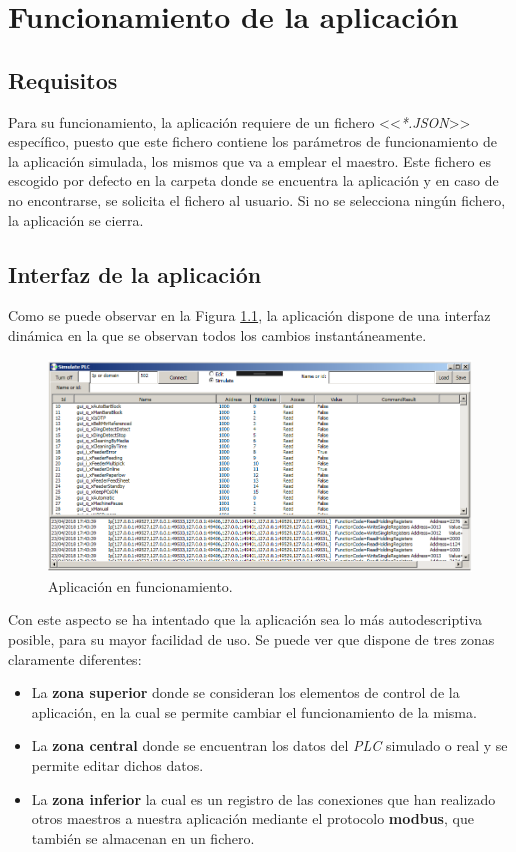 \documentclass[pdftex,11pt,a4paper]{book}
\begin{document}
\chapter{Funcionamiento de la aplicación}

\section{Requisitos}
Para su funcionamiento, la aplicación requiere de un fichero <<\emph{*.JSON}>> específico, puesto que este fichero contiene los parámetros de funcionamiento de la aplicación simulada, los mismos que va a emplear el maestro. Este fichero es escogido por defecto en la carpeta donde se encuentra la aplicación y en caso de no encontrarse, se solicita el fichero al usuario. Si no se selecciona ningún fichero, la aplicación se cierra. 

\section{Interfaz de la aplicación}
Como se puede observar en la Figura \ref{func_apli}, la aplicación dispone de una interfaz dinámica en la que se observan todos los cambios instantáneamente.

\begin{figure}
\includegraphics[width=\textwidth]{img/disenyo_ui2.png}
\caption{\label{func_apli}Aplicación en funcionamiento.}
\end{figure}

Con este aspecto se ha intentado que la aplicación sea lo más autodescriptiva posible, para su mayor facilidad de uso. Se puede ver que  dispone de tres zonas claramente diferentes:

\begin{itemize}
\item La \textbf{zona superior} donde se consideran los elementos de control de la aplicación, en la cual se permite cambiar el funcionamiento de la misma.
\item La \textbf{zona central} donde se encuentran los datos del \emph{PLC} simulado o real y se permite editar dichos datos.
\item La \textbf{zona inferior} la cual es un registro de las conexiones que han realizado otros maestros a nuestra aplicación mediante el protocolo \textbf{modbus}, que también se almacenan en un fichero.
\end{itemize}
\end{document}
